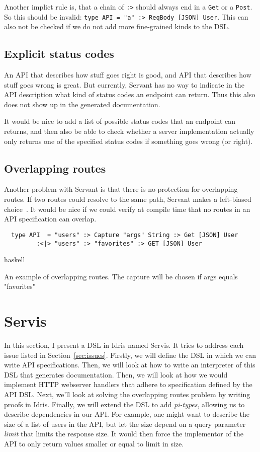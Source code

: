 \documentclass[12pt,a4paper]{article}
\begin{document}
Another implict rule is, that a chain of \texttt{:>} should always end in a \texttt{Get} or a \texttt{Post}. So this should be invalid: \texttt{type API = "a" :> ReqBody [JSON] User}.  This can also not be checked if we do not add more fine-grained kinds to the DSL.

\subsection{Explicit status codes}
An API that describes how stuff goes right is good, and API that describes how stuff goes wrong is great. But currently, Servant has no way to indicate in the API description what kind of status codes an endpoint can return. Thus this also does not show up in the generated documentation.

It would be nice to add a list of possible status codes that an endpoint can returns, and then also be able to check whether a server implementation actually only returns one of the specified status codes if something goes wrong (or right).

\subsection{Overlapping routes}
Another problem with Servant is that there is no protection for overlapping routes. If two routes could resolve to the same path, Servant makes a left-biased choice~\cite{servant}.
It would be nice if we could verify at compile time that no routes in an API specification can overlap.

\begin{listing}
\begin{verbatim}
  type API  = "users" :> Capture "args" String :> Get [JSON] User
         :<|> "users" :> "favorites" :> GET [JSON] User
\end{verbatim}{haskell}
\caption{An example of overlapping routes. The capture will be chosen if args equals "favorites"}
\end{listing}



\section{Servis}
In this section, I present a DSL in Idris named Servis. It tries to address each issue listed in Section~\ref{sec:issues}. Firstly, we will define the DSL in which we can write API specifications. Then, we will look at how to write an interpreter of this DSL that generates documentation. Then, we will look at how we would implement HTTP webserver handlers that adhere to specification defined by the API DSL\@. Next, we'll look at solving the overlapping routes problem by writing proofs in Idris.
Finally, we will extend the DSL to add \emph{pi-types}, allowing us to describe dependencies in our API\@.  For example, one might want to describe  the size of a list of users in the API, but let the size depend on a query parameter \emph{limit} that limits the response size.  It would then force the implementor of the API to only return values smaller or equal to limit in size.
\end{document}
